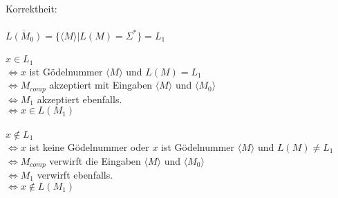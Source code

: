 \documentclass[a4paper,11pt]{scrartcl}
\begin{document}
\begin{enumerate}[label=\alph*)]
			Korrektheit:\\
			\\
			$\overline{L(M_0)} = \{\langle M \rangle \vert L(M) = \Sigma^*\} = L_1$\\
			\\
			$x \in L_1$\\
			$\Leftrightarrow x$ ist Gödelnummer $\langle M \rangle$ und $L(M) = L_1$\\
			$\Leftrightarrow M_{comp}$ akzeptiert mit Eingaben $\langle M \rangle$ und $\langle M_0 \rangle$\\
			$\Leftrightarrow M_1$ akzeptiert ebenfalls.\\
			$\Leftrightarrow x \in L(M_1)$\\
			\\
			$x \not\in L_1$\\
			$\Leftrightarrow x$ ist keine Gödelnummer oder $x$ ist Gödelnummer $\langle M \rangle$ und $L(M) \neq L_1$\\
			$\Leftrightarrow M_{comp}$ verwirft die Eingaben $\langle M \rangle$ und $\langle M_0 \rangle$\\
			$\Leftrightarrow M_1$ verwirft ebenfalls.\\
			$\Leftrightarrow x \not\in L(M_1)$\\
			
	\end{enumerate}
		
	\newpage
	
\end{document}
